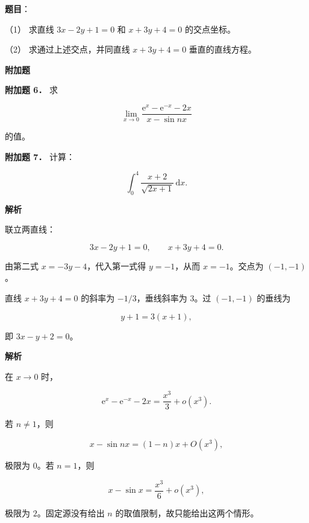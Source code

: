 \begin{answer}

\textbf{题目}：

（1） 求直线 $3x-2y+1=0$ 和 $x+3y+4=0$ 的交点坐标。

（2） 求通过上述交点，并同直线 $x+3y+4=0$ 垂直的直线方程。

\begin{gktip}
\Needspace{0.25\textheight}
\textbf{附加题}
\end{gktip}

\textbf{附加题 6．} 求

\nopagebreak[4]
\[
\lim_{x\to0}\frac{\mathrm e^x-\mathrm e^{-x}-2x}{x-\sin nx}
\]

的值。

\textbf{附加题 7．} 计算：

\nopagebreak[4]
\[
\int_0^4\frac{x+2}{\sqrt{2x+1}}\,\mathrm dx.
\]

\textbf{解析}


联立两直线：

\nopagebreak[4]
\[
3x-2y+1=0,\qquad x+3y+4=0.
\]

由第二式 $x=-3y-4$，代入第一式得 $y=-1$，从而 $x=-1$。交点为 $(-1,-1)$。


直线 $x+3y+4=0$ 的斜率为 $-1/3$，垂线斜率为 $3$。过 $(-1,-1)$ 的垂线为

\nopagebreak[4]
\[
y+1=3(x+1),
\]

即 $3x-y+2=0$。


\textbf{解析}

在 $x\to0$ 时，

\nopagebreak[4]
\[
\mathrm e^x-\mathrm e^{-x}-2x=\frac{x^3}{3}+o(x^3).
\]

若 $n\ne1$，则

\nopagebreak[4]
\[
x-\sin nx=(1-n)x+O(x^3),
\]

极限为 $0$。若 $n=1$，则

\nopagebreak[4]
\[
x-\sin x=\frac{x^3}{6}+o(x^3),
\]

极限为 $2$。固定源没有给出 $n$ 的取值限制，故只能给出这两个情形。



\end{answer}
